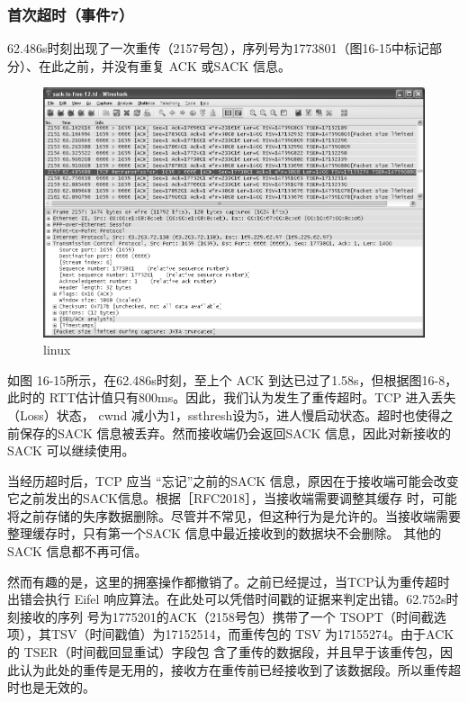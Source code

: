 \subsubsection{首次超时（事件7）}
62.486s时刻出现了一次重传（2157号包），序列号为1773801（图16-15中标记部分）、在此之前，并没有重复 ACK 或SACK 信息。
\begin{figure}[!htb]
    \centering
	\includegraphics[width=1\textwidth]{imgs/16/16-15.png}
	\caption{linux}
\end{figure}
如图 16-15所示，在62.486s时刻，至上个 ACK 到达已过了1.58s，但根据图16-8，此时的 RTT估计值只有800ms。因此，我们认为发生了重传超时。TCP 进入丢失（Loss）状态，
cwnd 减小为1，ssthresh设为5，进人慢启动状态。超时也使得之前保存的SACK 信息被丢弃。然而接收端仍会返回SACK 信息，因此对新接收的 SACK 可以继续使用。

\begin{tcolorbox}
    当经历超时后，TCP 应当 “忘记”之前的SACK 信息，原因在于接收端可能会改变它之前发出的SACK信息。根据［RFC2018］，当接收端需要调整其缓存
    时，可能将之前存储的失序数据删除。尽管并不常见，但这种行为是允许的。当接收端需要整理缓存时，只有第一个SACK 信息中最近接收到的数据块不会删除。
    其他的 SACK 信息都不再可信。
\end{tcolorbox}

然而有趣的是，这里的拥塞操作都撤销了。之前已经提过，当TCP认为重传超时出错会执行 Eifel 响应算法。在此处可以凭借时间戳的证据来判定出错。62.752s时刻接收的序列
号为1775201的ACK（2158号包）携带了一个 TSOPT（时间截选项），其TSV（时间戳值）为17152514，而重传包的 TSV 为17155274。由于ACK 的 TSER（时间截回显重试）字段包
含了重传的数据段，并且早于该重传包，因此认为此处的重传是无用的，接收方在重传前已经接收到了该数据段。所以重传超时也是无效的。

